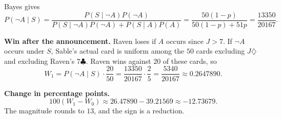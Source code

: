 Bayes gives
\[
P(\neg A\mid S)=\frac{P(S\mid \neg A)P(\neg A)}{P(S\mid \neg A)P(\neg A)+P(S\mid A)P(A)}
=\frac{50(1-p)}{50(1-p)+51p}
=\frac{13350}{20167}.
\]

\medskip

\textbf{Win after the announcement.}
Raven loses if \(A\) occurs since \(J>7\). If \(\neg A\) occurs under \(S\), Sable's actual card is uniform among the \(50\) cards excluding \(J\diamondsuit\) and excluding Raven's \(7\clubsuit\). Raven wins against \(20\) of these cards, so
\[
W_1=P(\neg A\mid S)\cdot\frac{20}{50}
=\frac{13350}{20167}\cdot\frac{2}{5}
=\frac{5340}{20167}\approx 0.2647890.
\]

\medskip

\textbf{Change in percentage points.}
\[
100(W_1-W_0)\approx 26.47890-39.21569\approx -12.73679.
\]
The magnitude rounds to \(13\), and the sign is a reduction.


\NextPage